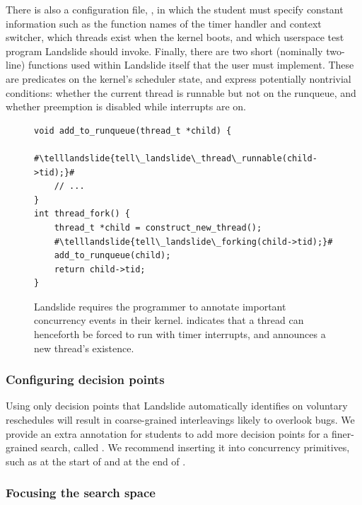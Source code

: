 There is also a configuration file, , in which the student must specify constant information such as the function names of the timer handler and context switcher, which threads exist when the kernel boots, and which userspace test program Landslide should invoke.
Finally, there are two short (nominally two-line) functions used within Landslide itself that the user must implement. These are predicates on the kernel's scheduler state, and express potentially nontrivial conditions: whether the current thread is runnable but not on the runqueue, and whether preemption is disabled while interrupts are on.

\newcommand\telllandslide[1]{\bfseries \color{violet}{#1}}
\begin{figure}[t]
\small
\begin{lstlisting}
void add_to_runqueue(thread_t *child) {
	#\telllandslide{tell\_landslide\_thread\_runnable(child->tid);}#
	// ...
}
int thread_fork() {
	thread_t *child = construct_new_thread();
	#\telllandslide{tell\_landslide\_forking(child->tid);}#
	add_to_runqueue(child);
	return child->tid;
}
\end{lstlisting}
\caption{Landslide requires the programmer to annotate important concurrency events in their kernel.  indicates that a thread can henceforth be forced to run with timer interrupts, and  announces a new thread's existence.}
\label{fig:annotation}
\end{figure}

\subsubsection{Configuring decision points}
\label{sec:decision}

Using only decision points that Landslide automatically identifies on voluntary reschedules will result in coarse-grained interleavings likely to overlook bugs.
We provide an extra annotation
for students to add more decision points for a finer-grained search, called
.
We recommend inserting it into concurrency primitives, such as at the start of  and at the end of .

\subsubsection{Focusing the search space}
\label{sec:focusing}

